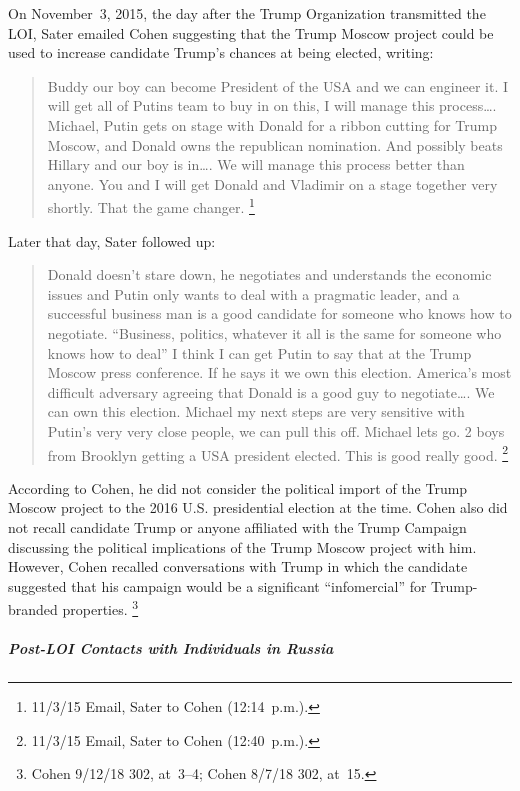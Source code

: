 On November~3, 2015, the day after the Trump Organization transmitted the LOI, Sater emailed Cohen suggesting that the Trump Moscow project could be used to increase candidate Trump's chances at being elected, writing:

\begin{quote}
Buddy our boy can become President of the USA and we can engineer it.
I will get all of Putins team to buy in on this, I will manage this process\dots.
Michael, Putin gets on stage with Donald for a ribbon cutting for Trump Moscow, and Donald owns the republican nomination.
And possibly beats Hillary and our boy is in\dots.
We will manage this process better than anyone.
You and I will get Donald and Vladimir on a stage together very shortly.
That the game changer.%
\footnote{11/3/15 Email, Sater to Cohen (12:14~p.m.).}
\end{quote}

Later that day, Sater followed up:

\begin{quote}
Donald doesn't stare down, he negotiates and understands the economic issues and Putin only wants to deal with a pragmatic leader, and a successful business man is a good candidate for someone who knows how to negotiate.
``Business, politics, whatever it all is the same for someone who knows how to deal''
I think I can get Putin to say that at the Trump Moscow press conference.
If he says it we own this election.
America's most difficult adversary agreeing that Donald is a good guy to negotiate\dots.
We can own this election.
Michael my next steps are very sensitive with Putin's very very close people, we can pull this off.
Michael lets go.
2 boys from Brooklyn getting a USA president elected.
This is good really good.%
\footnote{11/3/15 Email, Sater to Cohen (12:40~p.m.).}
\end{quote}

According to Cohen, he did not consider the political import of the Trump Moscow project to the 2016 U.S. presidential election at the time.
Cohen also did not recall candidate Trump or anyone affiliated with the Trump Campaign discussing the political implications of the Trump Moscow project with him.
However, Cohen recalled conversations with Trump in which the candidate suggested that his campaign would be a significant ``infomercial'' for Trump-branded properties.%
\footnote{Cohen 9/12/18 302, at~3--4; Cohen 8/7/18 302, at~15.}

\subparagraph{Post-LOI Contacts with Individuals in Russia}

